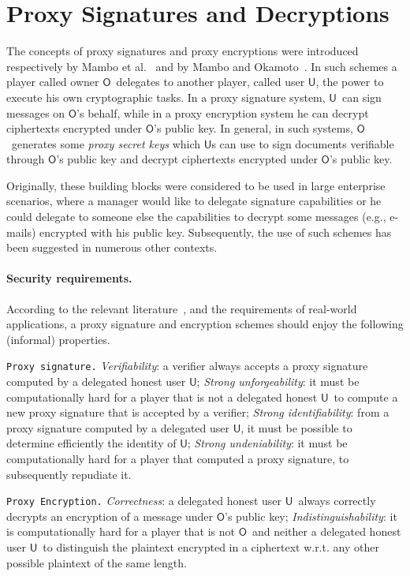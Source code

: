 \documentclass[runningheads]{llncs}
\newcommand{\Owner}{\ensuremath{\mathsf{O}}}
\newcommand{\User}{\ensuremath{\mathsf{U}}}
\begin{document}
\section{Proxy Signatures and Decryptions}
\label{relatedwork}
The concepts of proxy signatures and proxy encryptions were introduced respectively by Mambo et al.~\cite{DBLP:conf/ccs/MamboUO96} and by Mambo and Okamoto~\cite{MamboO97}.  In such schemes a player called owner \Owner\, delegates to another player, called user \User, the power to execute his own cryptographic tasks. In a proxy signature system, \User\ can sign messages on \Owner's behalf, while in a proxy encryption system he can decrypt ciphertexts encrypted under \Owner's public key. In general, in such systems, \Owner\ generates some \emph{proxy secret keys} which \User s can use to sign documents verifiable through \Owner's public key and decrypt ciphertexts encrypted under \Owner's  public key.

Originally, these building blocks were considered to be used in large enterprise scenarios, where a manager would like to delegate signature capabilities or he could delegate to  someone else the capabilities to decrypt some messages (e.g., e-mails) encrypted with his public key. Subsequently,  the use of such schemes has been suggested in numerous other contexts.

\paragraph{Security requirements.}
According to the relevant literature~\cite{DBLP:conf/ccs/MamboUO96,DBLP:conf/acisp/LeeKK012}, and
the requirements of real-world applications, a proxy signature and encryption schemes should
enjoy the following (informal) properties.

{\tt Proxy signature.}
{\em Verifiability}: a verifier always accepts a proxy signature computed by a delegated honest user \User;
{\em Strong unforgeability}: it must be computationally hard for a player that is not a delegated honest \User\ to compute a new proxy signature that is accepted by a verifier;
{\em Strong identifiability}: from a proxy signature computed by a delegated user \User, it must be possible to determine efficiently the identity of \User;
{\em Strong undeniability}:
it must be computationally hard for a player that computed a proxy signature, to subsequently repudiate it.

{\tt Proxy Encryption.}
{\em Correctness}: a delegated honest user \User\ always correctly decrypts an encryption of a message under \Owner's public key;
{\em Indistinguishability}: it is computationally hard for a player that is not \Owner\ and neither a delegated honest user
\User\ to distinguish the plaintext encrypted in a ciphertext w.r.t. any other possible plaintext of the same length.
\end{document}
